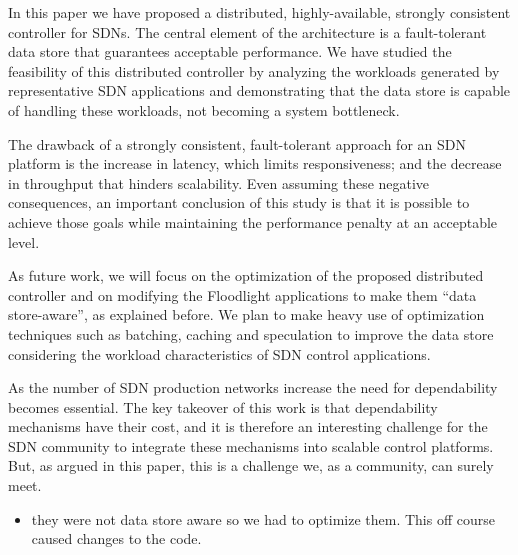 In this paper we have proposed a distributed, highly-available, strongly consistent controller for SDNs.
The central element of the architecture is a fault-tolerant data store that guarantees acceptable performance.
We have studied the feasibility of this distributed controller by analyzing  the workloads generated by representative SDN applications and demonstrating that the data store is capable of handling these workloads, not becoming a system bottleneck.

The drawback of a strongly consistent, fault-tolerant approach for an SDN platform is the increase in latency, which limits responsiveness; and the decrease in throughput that hinders scalability.
Even assuming these negative consequences, an important conclusion of this study is that it is possible to achieve those goals while maintaining the performance penalty at an acceptable level.

As future work, we will focus on the optimization of the proposed distributed controller and on modifying the Floodlight applications to make them ``data store-aware'', as explained before. 
We plan to make heavy use of optimization techniques such as batching, caching and speculation to improve the data store considering the workload characteristics of SDN control applications.

As the number of SDN production networks increase the need for dependability becomes essential. The key takeover of this work is that dependability mechanisms have their cost, and it is therefore an interesting challenge for the SDN community to integrate these mechanisms into scalable control platforms. But, as argued in this paper, this is a challenge we, as a community, can surely meet.\\


\begin{itemize}
\item they were not data store aware so we had to optimize them. This off course caused changes to the code.
\end{itemize}



